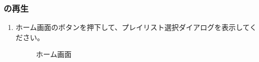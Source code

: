     \subsubsection{\playlist の再生}
        \begin{enumerate}
            \item ホーム画面のボタンを押下して、プレイリスト選択ダイアログを表示してください。
                \begin{figure}[htbp]
                    \begin{minipage}[b]{0.45\linewidth}
                        \centering
                        \caption{ホーム画面}
                        \label{img:playlist8}
                    \end{minipage}
                    \begin{minipage}[b]{0.45\linewidth}
                        \centering
\end{minipage}
\end{figure}
\end{enumerate}
